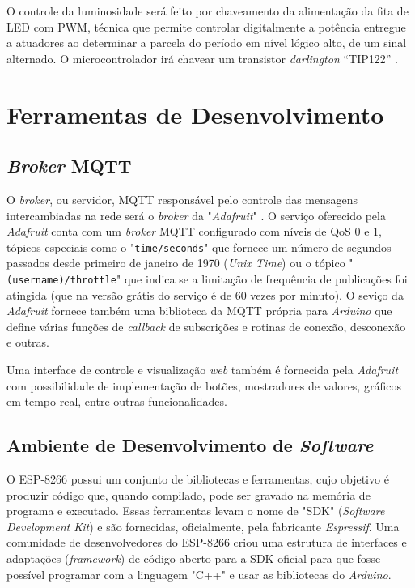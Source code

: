 O controle da luminosidade será feito por chaveamento da alimentação da fita de LED com \acf{PWM}, técnica que permite controlar digitalmente a potência entregue a atuadores ao determinar a parcela do período em nível lógico alto, de um sinal alternado. O microcontrolador irá chavear um transistor \textit{darlington} “TIP122” \cite{tip122}.

\section{Ferramentas de Desenvolvimento}

\subsection{\textit{Broker} MQTT}

O \textit{broker}, ou servidor, MQTT responsável pelo controle das mensagens intercambiadas na rede será o \textit{broker} da "\textit{Adafruit}" \cite{adafruit}. O serviço oferecido pela \textit{Adafruit} conta com um  \textit{broker} MQTT configurado com níveis de QoS 0 e 1, tópicos especiais como o "\texttt{time/seconds}" que fornece um número de segundos passados desde primeiro de janeiro de 1970 (\textit{Unix Time}) ou o tópico "\texttt{(username)/throttle}" que indica se a limitação de frequência de publicações foi atingida (que na versão grátis do serviço é de 60 vezes por minuto). O seviço da \textit{Adafruit} fornece também uma biblioteca da MQTT própria para \textit{Arduino} que define várias funções de \textit{callback} de subscrições e rotinas de conexão, desconexão e outras.

Uma interface de controle e visualização \textit{web} também é fornecida pela \textit{Adafruit} com possibilidade de implementação de botões, mostradores de valores, gráficos em tempo real, entre outras funcionalidades.

\subsection{Ambiente de Desenvolvimento de \textit{Software}}

O ESP-8266 possui um conjunto de bibliotecas e ferramentas, cujo objetivo é produzir código que, quando compilado, pode ser gravado na memória de programa e executado. Essas ferramentas levam o nome de "SDK" (\textit{Software Development Kit}) e são fornecidas, oficialmente, pela fabricante \textit{Espressif}. Uma comunidade de desenvolvedores do ESP-8266 criou uma estrutura de interfaces e adaptações (\textit{framework}) de código aberto para a SDK oficial para que fosse possível programar com a linguagem "C++" e usar as bibliotecas do \textit{Arduino}.

